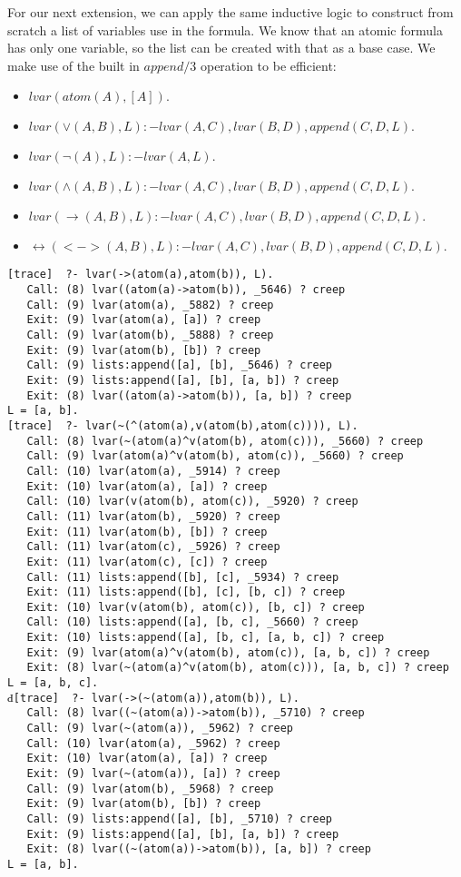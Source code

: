 \documentclass[fullpage]{article}
\begin{document}
For our next extension, we can apply the same inductive logic to construct from scratch a list of variables use in the formula. We know that an atomic formula has only one variable, so the list can be created with that as a base case. We make use of the built in $append/3$ operation to be efficient:
\begin{itemize}
\item {\em $lvar(atom(A), [A]).$}
\item {\em $lvar(\vee(A, B), L):-lvar(A, C),lvar(B, D),append(C, D, L).$}
\item {\em $lvar(\neg(A), L):-lvar(A, L).$}
\item {\em $lvar(\wedge(A, B), L):-lvar(A, C),lvar(B, D),append(C, D, L).$}
\item {\em $lvar(\rightarrow(A, B), L):-lvar(A, C),lvar(B, D),append(C, D, L).$}
\item {\em $\leftrightarrow(<->(A, B), L):-lvar(A, C),lvar(B, D),append(C, D, L).$}
\end{itemize}
\begin{verbatim}
[trace]  ?- lvar(->(atom(a),atom(b)), L).
   Call: (8) lvar((atom(a)->atom(b)), _5646) ? creep
   Call: (9) lvar(atom(a), _5882) ? creep
   Exit: (9) lvar(atom(a), [a]) ? creep
   Call: (9) lvar(atom(b), _5888) ? creep
   Exit: (9) lvar(atom(b), [b]) ? creep
   Call: (9) lists:append([a], [b], _5646) ? creep
   Exit: (9) lists:append([a], [b], [a, b]) ? creep
   Exit: (8) lvar((atom(a)->atom(b)), [a, b]) ? creep
L = [a, b].
[trace]  ?- lvar(~(^(atom(a),v(atom(b),atom(c)))), L).
   Call: (8) lvar(~(atom(a)^v(atom(b), atom(c))), _5660) ? creep
   Call: (9) lvar(atom(a)^v(atom(b), atom(c)), _5660) ? creep
   Call: (10) lvar(atom(a), _5914) ? creep
   Exit: (10) lvar(atom(a), [a]) ? creep
   Call: (10) lvar(v(atom(b), atom(c)), _5920) ? creep
   Call: (11) lvar(atom(b), _5920) ? creep
   Exit: (11) lvar(atom(b), [b]) ? creep
   Call: (11) lvar(atom(c), _5926) ? creep
   Exit: (11) lvar(atom(c), [c]) ? creep
   Call: (11) lists:append([b], [c], _5934) ? creep
   Exit: (11) lists:append([b], [c], [b, c]) ? creep
   Exit: (10) lvar(v(atom(b), atom(c)), [b, c]) ? creep
   Call: (10) lists:append([a], [b, c], _5660) ? creep
   Exit: (10) lists:append([a], [b, c], [a, b, c]) ? creep
   Exit: (9) lvar(atom(a)^v(atom(b), atom(c)), [a, b, c]) ? creep
   Exit: (8) lvar(~(atom(a)^v(atom(b), atom(c))), [a, b, c]) ? creep
L = [a, b, c].
Ԁ[trace]  ?- lvar(->(~(atom(a)),atom(b)), L).
   Call: (8) lvar((~(atom(a))->atom(b)), _5710) ? creep
   Call: (9) lvar(~(atom(a)), _5962) ? creep
   Call: (10) lvar(atom(a), _5962) ? creep
   Exit: (10) lvar(atom(a), [a]) ? creep
   Exit: (9) lvar(~(atom(a)), [a]) ? creep
   Call: (9) lvar(atom(b), _5968) ? creep
   Exit: (9) lvar(atom(b), [b]) ? creep
   Call: (9) lists:append([a], [b], _5710) ? creep
   Exit: (9) lists:append([a], [b], [a, b]) ? creep
   Exit: (8) lvar((~(atom(a))->atom(b)), [a, b]) ? creep
L = [a, b].
\end{verbatim}
\end{document}
